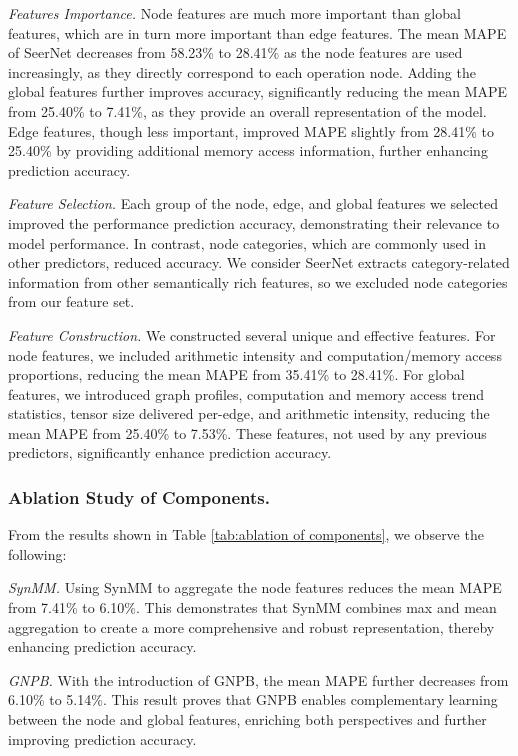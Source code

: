\emph{Features Importance.} 
Node features are much more important than global features, which are in turn more important than edge features. 
The mean MAPE of SeerNet decreases from 58.23\% to 28.41\% as the node features are used increasingly, as they directly correspond to each operation node.
Adding the global features further improves accuracy, significantly reducing the mean MAPE from 25.40\% to 7.41\%, as they provide an overall representation of the model.
Edge features, though less important, improved MAPE slightly from 28.41\% to 25.40\% by providing additional memory access information, further enhancing prediction accuracy.

\emph{Feature Selection.} 
Each group of the node, edge, and global features we selected improved the performance prediction accuracy, demonstrating their relevance to model performance.
In contrast, node categories, which are commonly used in other predictors, reduced accuracy. We consider SeerNet extracts category-related information from other semantically rich features, so we excluded node categories from our feature set.

\emph{Feature Construction.} 
We constructed several unique and effective features. 
For node features, we included arithmetic intensity and computation/memory access proportions, reducing the mean MAPE from 35.41\% to 28.41\%. 
For global features, we introduced graph profiles, computation and memory access trend statistics, tensor size delivered per-edge, and arithmetic intensity, reducing the mean MAPE from 25.40\% to 7.53\%. 
These features, not used by any previous predictors, significantly enhance prediction accuracy.

\subsubsection{Ablation Study of Components.}\label{sec:ablation component}
From the results shown in Table \ref{tab:ablation of components}, we observe the following:

\emph{SynMM.}
Using SynMM to aggregate the node features reduces the mean MAPE from 7.41\% to 6.10\%. This demonstrates that SynMM combines max and mean aggregation to create a more comprehensive and robust representation, thereby enhancing prediction accuracy.

\emph{GNPB.}
With the introduction of GNPB, the mean MAPE further decreases from 6.10\% to 5.14\%. This result proves that GNPB enables complementary learning between the node and global features, enriching both perspectives and further improving prediction accuracy.

